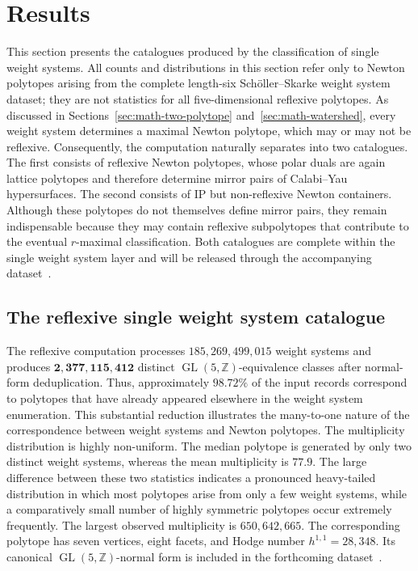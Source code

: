 \documentclass[appliedmath,article,submit,moreauthors]{Definitions/mdpi}
\newcommand{\Z}{\mathbb{Z}}
\newcommand{\GL}{\operatorname{GL}}
\begin{document}
\section{Results}
\label{sec:results}

This section presents the catalogues produced by the classification of single
weight systems. {\color{blue}All counts and distributions in this section refer
only to Newton polytopes arising from the complete length-six
Sch\"oller--Skarke weight system dataset; they are not statistics for all
five-dimensional reflexive polytopes.} As discussed in
Sections~\ref{sec:math-two-polytope} and~\ref{sec:math-watershed},
every weight system determines a maximal Newton polytope, which may or may not
be reflexive. Consequently, the computation naturally separates into two
catalogues. The first consists of reflexive Newton polytopes, whose polar duals
are again lattice polytopes and therefore determine mirror pairs of Calabi--Yau
hypersurfaces. The second consists of IP but non-reflexive Newton containers.
Although these polytopes do not themselves define mirror pairs, they remain
indispensable because they may contain reflexive subpolytopes that contribute to
the eventual \(r\)-maximal classification. Both catalogues are complete within
the single weight system layer and will be released through the accompanying
dataset~\cite{Scholler2019,Dataset2026}.

\subsection{The reflexive single weight system catalogue}
\label{sec:results-reflexive}

The reflexive computation processes \(185{,}269{,}499{,}015\) weight systems and
produces \(\mathbf{2{,}377{,}115{,}412}\) distinct \(\GL(5,\Z)\)-equivalence
classes after normal-form deduplication. Thus, approximately \(98.72\%\) of the
input records correspond to polytopes that have already appeared elsewhere in
the weight system enumeration. This substantial reduction illustrates the
many-to-one nature of the correspondence between weight systems and Newton
polytopes.
The multiplicity distribution is highly non-uniform. The median polytope is
generated by only two distinct weight systems, whereas the mean multiplicity is
\(77.9\). The large difference between these two statistics indicates a
pronounced heavy-tailed distribution in which most polytopes arise from only a
few weight systems, while a comparatively small number of highly symmetric
polytopes occur extremely frequently.
The largest observed multiplicity is \(650{,}642{,}665\). The corresponding
polytope has seven vertices, eight facets, and Hodge number
\(h^{1,1}=28{,}348\). Its canonical \(\GL(5,\Z)\)-normal form is included in the
forthcoming dataset~\cite{Dataset2026}.
\end{document}
